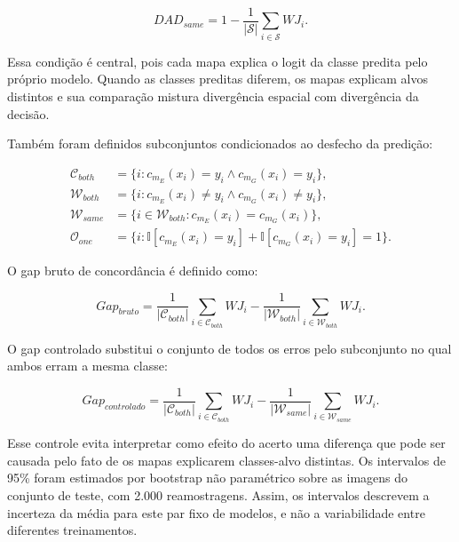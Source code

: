 \begin{equation}
DAD_{same}
= 1 - \frac{1}{|\mathcal{S}|}\sum_{i\in\mathcal{S}} WJ_i.
\label{eq:dad_same}
\end{equation}

Essa condi\c{c}\~ao \'{e} central, pois cada mapa explica o logit da classe predita
pelo pr\'oprio modelo. Quando as classes preditas diferem, os mapas explicam
alvos distintos e sua compara\c{c}\~ao mistura diverg\^encia espacial com diverg\^encia
da decis\~ao.

Tamb\'em foram definidos subconjuntos condicionados ao desfecho da predi\c{c}\~ao:

\begin{align}
\mathcal{C}_{both} &=
\{i:c_{m_E}(x_i)=y_i \land c_{m_G}(x_i)=y_i\},\\
\mathcal{W}_{both} &=
\{i:c_{m_E}(x_i)\neq y_i \land c_{m_G}(x_i)\neq y_i\},\\
\mathcal{W}_{same} &=
\{i\in\mathcal{W}_{both}:c_{m_E}(x_i)=c_{m_G}(x_i)\},\\
\mathcal{O}_{one} &=
\{i:\mathbb{I}[c_{m_E}(x_i)=y_i]+\mathbb{I}[c_{m_G}(x_i)=y_i]=1\}.
\end{align}

O gap bruto de concord\^ancia \'{e} definido como:

\begin{equation}
Gap_{bruto} =
\frac{1}{|\mathcal{C}_{both}|}\sum_{i\in\mathcal{C}_{both}} WJ_i
-
\frac{1}{|\mathcal{W}_{both}|}\sum_{i\in\mathcal{W}_{both}} WJ_i.
\label{eq:raw_gap}
\end{equation}

O gap controlado substitui o conjunto de todos os erros pelo subconjunto no qual
ambos erram a mesma classe:

\begin{equation}
Gap_{controlado} =
\frac{1}{|\mathcal{C}_{both}|}\sum_{i\in\mathcal{C}_{both}} WJ_i
-
\frac{1}{|\mathcal{W}_{same}|}\sum_{i\in\mathcal{W}_{same}} WJ_i.
\label{eq:controlled_gap}
\end{equation}

Esse controle evita interpretar como efeito do acerto uma diferen\c{c}a que pode
ser causada pelo fato de os mapas explicarem classes-alvo distintas. Os
intervalos de 95\% foram estimados por bootstrap n\~ao param\'etrico sobre as
imagens do conjunto de teste, com 2.000 reamostragens. Assim, os intervalos
descrevem a incerteza da m\'edia para este par fixo de modelos, e n\~ao a
variabilidade entre diferentes treinamentos.

